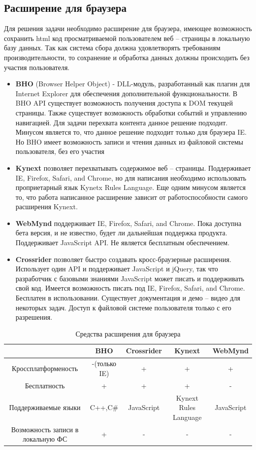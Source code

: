 \documentclass[russian, utf8, emptystyle]{eskdtext}
\begin{document}
\subsection{Расширение для браузера}
Для решения задачи необходимо расширение для браузера, имеющее возможность сохранить html код просматриваемой пользователем веб – страницы в локальную базу данных. Так как система сбора должна удовлетворять требованиям производительности, то сохранение и обработка данных должны происходить без участия пользователя.
\begin{itemize}
	\item {\bf BHO} (Browser Helper Object) - DLL-модуль, разработанный как плагин для Internet Explorer для обеспечения дополнительной функциональности. В BHO API существует возможность получения доступа к DOM текущей страницы. Также существует возможность обработки событий и управлению навигацией. Для задачи перехвата контента данное решение подходит. Минусом является то, что данное решение подходит только для браузера IE. Но BHO имеет возможность записи и чтения данных из файловой системы пользователя, без его участия
	\item {\bf Kynext} позволяет перехватывать содержимое веб – страницы. Поддерживает IE, Firefox, Safari, and Chrome, но для написания необходимо использовать проприетарный язык Kynetx Rules Language. Еще одним минусом является то, что работа написанное расширение зависит от работоспособности самого расширения Kynext.
	\item {\bf WebMynd} поддерживает  IE, Firefox, Safari, and Chrome. Пока доступна бета версия, и не известно, будет ли дальнейшая поддержка продукта. Поддерживает JavaScript API. Не является бесплатным обеспечением.
	\item {\bf Crossrider} позволяет быстро создавать кросс-браузерные расширения. Использует один API и поддерживает JavaScript и jQuery, так что разработчик с базовыми знаниями JavaScript может писать и поддерживать свой код. Имеется возможность писать под IE, Firefox, Safari, and Chrome. Бесплатен в использовании. Существует документация и демо – видео для некоторых задач. Доступ к файловой системе пользователя только с его разрешения. 
\end{itemize}
\begin{table} 
	\caption{Средства расширения для браузера}
	\label{tab:far}
	\begin{center}
		\begin{tabular}{|c|c|c|c|c|}
			\hline
			& BHO & Crossrider & Kynext   & WebMynd     \\
			\hline     
			Кроссплатформеность  & -(только IE) & + & + & + \\
			\hline
			Бесплатность & + & + & + & -\\
			\hline
			Поддерживаемые языки & C++,C\# & JavaScript & Kynext Rules Language & JavaScript  \\
			\hline
			Возможность записи в локальную ФС & + & - & - &- \\
			\hline
		\end{tabular}
	\end{center}
\end{table}
\end{document}
